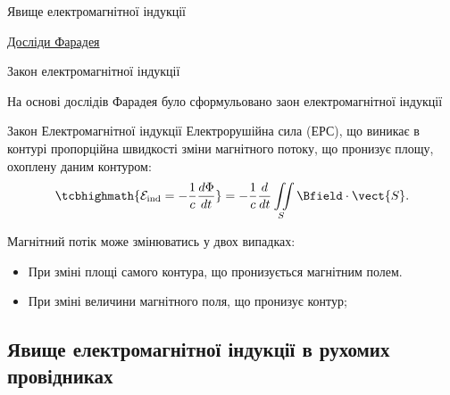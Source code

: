 \documentclass[onlytextwidth]{beamer}
\begin{document}
\begin{frame}{Явище електромагнітної індукції}{}
\begin{overprint}
\begin{center}
\begin{pict}
			\end{pict}
			\href{https://youtu.be/GrBYG8NIUoU}{\color{blue}\small Досліди Фарадея}
		\end{center}
	\end{overprint}
        \end{frame}



\begin{frame}{Закон електромагнітної індукції}{}
	\begin{block}{}
		На основі дослідів Фарадея було сформульовано заон електромагнітної індукції
	\end{block}
	\begin{block}{Закон Електромагнітної індукції}\justifying
		Електрорушійна сила (ЕРС), що виникає в контурі пропорційна швидкості зміни магнітного потоку, що пронизує площу, охоплену даним контуром:
		\begin{equation*}
			\tcbhighmath{\mathcal{E}_\text{ind} =  -\frac1c \frac{d\Phi}{dt}} = -\frac1c \frac{d}{dt} \iint\limits_S \Bfield\cdot\vect{S}.
		\end{equation*}
	\end{block}
	\begin{block}{}
		Магнітний потік може змінюватись  у двох випадках:
		\begin{itemize}
			\item При зміні площі самого контура, що пронизується магнітним полем.
			\item При зміні величини магнітного поля, що пронизує контур;
		\end{itemize}
	\end{block}
\end{frame}


\subsection{Явище електромагнітної індукції в рухомих провідниках}
\end{document}
